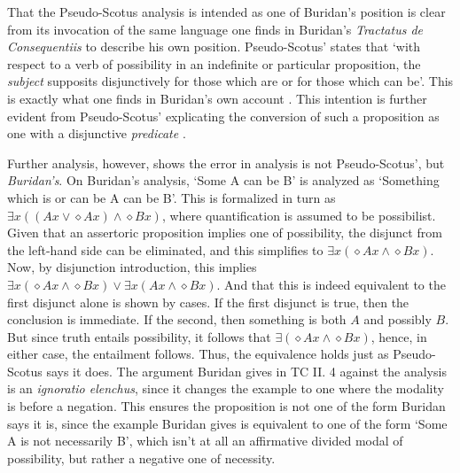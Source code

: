 \documentclass[]{article}
\begin{document}
That the Pseudo-Scotus analysis is intended as one of Buridan's position is clear from its invocation of the same language one finds in Buridan's \textit{Tractatus de Consequentiis} to describe his own position. Pseudo-Scotus' states that `with respect to a verb of possibility in an indefinite or particular proposition, the \textit{subject} supposits disjunctively for those which are or for those which can be'\cite[In anal. pr. I, q. 26, p. 143]{Pseudo-Scotus1891}. This is exactly what one finds in Buridan's own account \cite[TC II, 4, p. 97]{Buridan2015}. This intention is further evident from Pseudo-Scotus' explicating the conversion of such a proposition as one with a disjunctive \textit{predicate} \cite[In anal. pr. I, q. 26, p. 145]{Pseudo-Scotus1891}. 

Further analysis, however, shows the error in analysis is not Pseudo-Scotus', but \textit{Buridan's}. On Buridan's analysis, `Some A can be B' is analyzed as `Something which is or can be A can be B'. This is formalized in turn as $\exists x((Ax \vee \diamond Ax) \wedge \diamond Bx)$, where quantification is assumed to be possibilist. Given that an assertoric proposition implies one of possibility, the disjunct from the left-hand side can be eliminated, and this simplifies to $\exists x(\diamond Ax \wedge \diamond Bx)$. Now, by disjunction introduction, this implies $\exists x(\diamond Ax \wedge \diamond Bx) \vee \exists x(Ax \wedge \diamond Bx)$. And that this is indeed equivalent to the first disjunct alone is shown by cases. If the first disjunct is true, then the conclusion is immediate. If the second, then something is both $A$ and possibly $B$. But since truth entails possibility, it follows that $\exists(\diamond Ax \wedge \diamond Bx)$, hence, in either case, the entailment follows. Thus, the equivalence holds just as Pseudo-Scotus says it does. The argument Buridan gives in TC II. 4 against the analysis is an \textit{ignoratio elenchus}, since it changes the example to one where the modality is before a negation. This ensures the proposition is not one of the form Buridan says it is, since the example Buridan gives is equivalent to one of the form `Some A is not necessarily B', which isn't at all an affirmative divided modal of possibility, but rather a negative one of necessity.
\end{document}
